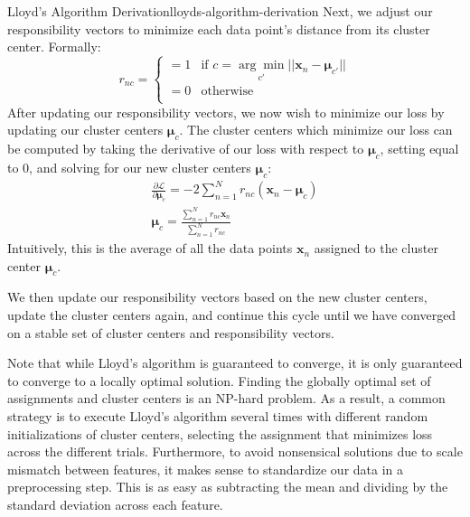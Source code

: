\begin{derivation}{Lloyd's Algorithm Derivation}{lloyds-algorithm-derivation}
	Next, we adjust our responsibility vectors to minimize each data point's distance from its cluster center. Formally:
	\begin{equation} \label{responsibility-vector-update}
		r_{nc} = \begin{cases}
		 	= 1 & \text{if $c = \underset{c'}{\arg\min} ||\textbf{x}_{n} - \boldsymbol{\mu}_{c'}||$} \\
			= 0 & \text{otherwise} \\
		\end{cases}
	\end{equation}
	After updating our responsibility vectors, we now wish to minimize our loss by updating our cluster centers $\boldsymbol{\mu}_{c}$. The cluster centers which minimize our loss can be computed by taking the derivative of our loss with respect to $\boldsymbol{\mu}_{c}$, setting equal to 0, and solving for our new cluster centers $\boldsymbol{\mu}_{c}$:
	\begin{equation} \label{update-cluster-centers}
		\begin{aligned}
			\frac{\partial \mathcal{L}}{\partial \boldsymbol{\mu}_{c}} = -2 \sum_{n=1}^{N} r_{nc} (\textbf{x}_{n} - \boldsymbol{\mu}_{c}) \\
			\boldsymbol{\mu}_{c} = \frac{\sum_{n=1}^{N} r_{nc} \textbf{x}_{n}}{\sum_{n=1}^{N} r_{nc}}
		\end{aligned}
	\end{equation}
	Intuitively, this is the average of all the data points $\textbf{x}_{n}$ assigned to the cluster center $\boldsymbol{\mu}_{c}$. \newline

	We then update our responsibility vectors based on the new cluster centers, update the cluster centers again, and continue this cycle until we have converged on a stable set of cluster centers and responsibility vectors.
\end{derivation}

Note that while Lloyd's algorithm is guaranteed to converge, it is only guaranteed to converge to a locally optimal solution. Finding the globally optimal set of assignments and cluster centers is an NP-hard problem. As a result, a common strategy is to execute Lloyd's algorithm several times with different random initializations of cluster centers, selecting the assignment that minimizes loss across the different trials. Furthermore, to avoid nonsensical solutions due to scale mismatch between features, it makes sense to standardize our data in a preprocessing step. This is as easy as subtracting the mean and dividing by the standard deviation across each feature.

